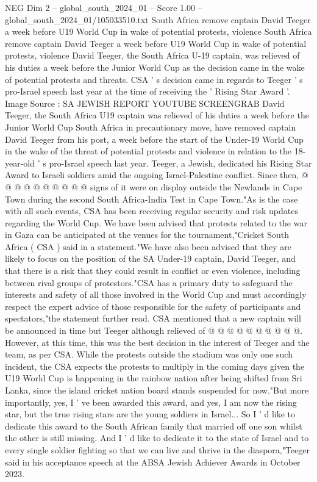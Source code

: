 \begin{textsample}{NEG Dim 2 – global\_south\_2024\_01 – Score 1.00 – global\_south\_2024\_01/105033510.txt}  \label{ex:f2_neg_324}
South Africa remove captain David Teeger a week before U19 World Cup in wake of potential protests, violence South Africa remove captain David Teeger a week before U19 World Cup in wake of potential protests, violence David Teeger, the South Africa U-19 captain, was relieved of his duties a week before the Junior World Cup as the decision came in the wake of potential protests and threats.
CSA ' s decision came in regards to Teeger ' s pro-Israel speech last year at the time of receiving the ' Rising Star Award '.
Image Source : SA JEWISH REPORT YOUTUBE SCREENGRAB David Teeger, the South Africa U19 captain was relieved of his duties a week before the Junior World Cup South Africa in precautionary move, have removed captain David Teeger from his post, a week before the start of the Under-19 World Cup in the wake of the threat of potential protests and violence in relation to the 18-year-old ' s pro-Israel speech last year.
Teeger, a Jewish, dedicated his Rising Star Award to Israeli soldiers amid the ongoing Israel-Palestine conflict.
Since then, @ @ @ @ @ @ @ @ @ @ signs of it were on display outside the Newlands in Cape Town during the second South Africa-India Test in Cape Town."As is the case with all such events, CSA has been receiving regular security and risk updates regarding the World Cup.
We have been advised that protests related to the war in Gaza can be anticipated at the venues for the tournament,"Cricket South Africa ( CSA ) said in a statement."We have also been advised that they are likely to focus on the position of the SA Under-19 captain, David Teeger, and that there is a risk that they could result in conflict or even violence, including between rival groups of protestors."CSA has a primary duty to safeguard the interests and safety of all those involved in the World Cup and must accordingly respect the expert advice of those responsible for the safety of participants and spectators,"the statement further read.
CSA mentioned that a new captain will be announced in time but Teeger although relieved of @ @ @ @ @ @ @ @ @ @.
However, at this time, this was the best decision in the interest of Teeger and the team, as per CSA.
While the protests outside the stadium was only one such incident, the CSA expects the protests to multiply in the coming days given the U19 World Cup is happening in the rainbow nation after being shifted from Sri Lanka, since the island cricket nation board stands suspended for now."But more importantly, yes, I ' ve been awarded this award, and yes, I am now the rising star, but the true rising stars are the young soldiers in Israel...
So I ' d like to dedicate this award to the South African family that married off one son whilst the other is still missing.
And I ' d like to dedicate it to the state of Israel and to every single soldier fighting so that we can live and thrive in the diaspora,"Teeger said in his acceptance speech at the ABSA Jewish Achiever Awards in October 2023.

\end{textsample}
